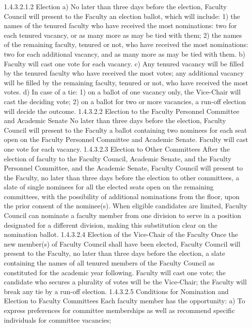 \documentclass[letterpaper, 11pt]{article}
\begin{document}
			1.4.3.2.1.2 Election
			a) No later than three days before the election, Faculty Council will present to the Faculty an election ballot, which will include:
			1) the names of the tenured faculty who have received the most nominations:  two for each tenured vacancy, or as many more as may be tied with them;
			2) the names of the remaining faculty, tenured or not, who have received the most nominations:  two for each additional vacancy, and as many more as may be tied with them.
			b) Faculty will cast one vote for each vacancy.
			c) Any tenured vacancy will be filled by the tenured faculty who have received the most votes; any additional vacancy will be filled by the remaining faculty, tenured or not, who have received the most votes.
			d) In case of a tie:
			1) on a ballot of one vacancy only, the Vice-Chair will cast the deciding vote;
			2) on a ballot for two or more vacancies, a run-off election will decide the outcome.
			1.4.3.2.2 Election to the Faculty Personnel Committee and Academic Senate
			No later than three days before the election, Faculty Council will present to the Faculty a ballot containing two nominees for each seat open on the Faculty Personnel Committee and Academic Senate.  Faculty will cast one vote for each vacancy.
			1.4.3.2.3 Election to Other Committees
			After the election of faculty to the Faculty Council, Academic Senate, and the Faculty Personnel Committee, and the Academic Senate, Faculty Council will present to the Faculty, no later than three days before the election to other committees, a slate of single nominees for all the elected seats open on the remaining committees, with the possibility of additional nominations from the floor, upon the prior consent of the nominee(s).  When eligible candidates are limited, Faculty Council can nominate a faculty member from one division to serve in a position designated for a different division, making this substitution clear on the nomination ballot.
			1.4.3.2.4 Election of the Vice-Chair of the Faculty
			Once the new member(s) of Faculty Council shall have been elected, Faculty Council will present to the Faculty, no later than three days before the election, a slate containing the names of all tenured members of the Faculty Council as constituted for the academic year following.  Faculty will cast one vote; the candidate who secures a plurality of votes will be the Vice-Chair; the Faculty will break any tie by a run-off election.
			1.4.3.2.5 Conditions for Nomination and Election to Faculty Committees
			Each faculty member has the opportunity:
			a) To express preferences for committee memberships as well as recommend specific individuals for committee vacancies;
\end{document}
